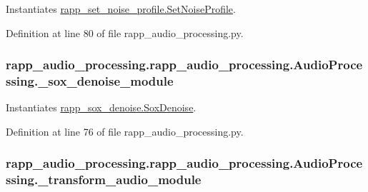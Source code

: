 Instantiates \hyperlink{classrapp__audio__processing_1_1rapp__set__noise__profile_1_1SetNoiseProfile}{rapp\-\_\-set\-\_\-noise\-\_\-profile.\-Set\-Noise\-Profile}. 



Definition at line 80 of file rapp\-\_\-audio\-\_\-processing.\-py.

\hypertarget{classrapp__audio__processing_1_1rapp__audio__processing_1_1AudioProcessing_a4a4e243504111ff3396a1fa9647d54ab}{
\subsubsection[{\-\_\-sox\-\_\-denoise\-\_\-module}]{\setlength{\rightskip}{0pt plus 5cm}rapp\-\_\-audio\-\_\-processing.\-rapp\-\_\-audio\-\_\-processing.\-Audio\-Processing.\-\_\-sox\-\_\-denoise\-\_\-module\hspace{0.3cm}{\ttfamily [private]}}}\label{classrapp__audio__processing_1_1rapp__audio__processing_1_1AudioProcessing_a4a4e243504111ff3396a1fa9647d54ab}


Instantiates \hyperlink{classrapp__audio__processing_1_1rapp__sox__denoise_1_1SoxDenoise}{rapp\-\_\-sox\-\_\-denoise.\-Sox\-Denoise}. 



Definition at line 76 of file rapp\-\_\-audio\-\_\-processing.\-py.

\hypertarget{classrapp__audio__processing_1_1rapp__audio__processing_1_1AudioProcessing_a4a55e532f2c513b4d6e888565aab5ff3}{
\subsubsection[{\-\_\-transform\-\_\-audio\-\_\-module}]{\setlength{\rightskip}{0pt plus 5cm}rapp\-\_\-audio\-\_\-processing.\-rapp\-\_\-audio\-\_\-processing.\-Audio\-Processing.\-\_\-transform\-\_\-audio\-\_\-module\hspace{0.3cm}{\ttfamily [private]}}}\label{classrapp__audio__processing_1_1rapp__audio__processing_1_1AudioProcessing_a4a55e532f2c513b4d6e888565aab5ff3}


